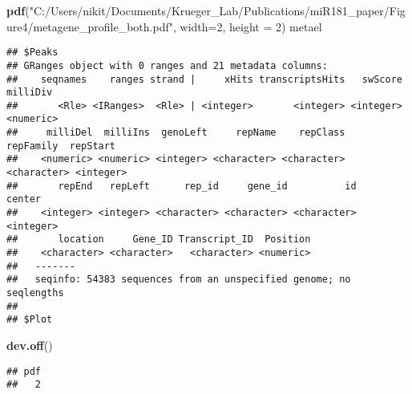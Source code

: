 \documentclass[
]{article}
\newenvironment{Shaded}{\begin{snugshade}}{\end{snugshade}}
\newcommand{\AttributeTok}[1]{\textcolor[rgb]{0.13,0.29,0.53}{#1}}
\newcommand{\CommentTok}[1]{\textcolor[rgb]{0.56,0.35,0.01}{\textit{#1}}}
\newcommand{\DecValTok}[1]{\textcolor[rgb]{0.00,0.00,0.81}{#1}}
\newcommand{\FunctionTok}[1]{\textcolor[rgb]{0.13,0.29,0.53}{\textbf{#1}}}
\newcommand{\NormalTok}[1]{#1}
\newcommand{\OtherTok}[1]{\textcolor[rgb]{0.56,0.35,0.01}{#1}}
\newcommand{\SpecialCharTok}[1]{\textcolor[rgb]{0.81,0.36,0.00}{\textbf{#1}}}
\newcommand{\StringTok}[1]{\textcolor[rgb]{0.31,0.60,0.02}{#1}}
\begin{document}
\begin{Shaded}
\begin{Highlighting}[]
\FunctionTok{pdf}\NormalTok{(}\StringTok{"C:/Users/nikit/Documents/Krueger\_Lab/Publications/miR181\_paper/Figure4/metagene\_profile\_both.pdf"}\NormalTok{, }\AttributeTok{width=}\DecValTok{2}\NormalTok{, }\AttributeTok{height =} \DecValTok{2}\NormalTok{)}
\NormalTok{metael}
\end{Highlighting}
\end{Shaded}

\begin{verbatim}
## $Peaks
## GRanges object with 0 ranges and 21 metadata columns:
##    seqnames    ranges strand |     xHits transcriptsHits   swScore  milliDiv
##       <Rle> <IRanges>  <Rle> | <integer>       <integer> <integer> <numeric>
##     milliDel  milliIns  genoLeft     repName    repClass   repFamily  repStart
##    <numeric> <numeric> <integer> <character> <character> <character> <integer>
##       repEnd   repLeft      rep_id     gene_id          id    center
##    <integer> <integer> <character> <character> <character> <integer>
##       location     Gene_ID Transcript_ID  Position
##    <character> <character>   <character> <numeric>
##   -------
##   seqinfo: 54383 sequences from an unspecified genome; no seqlengths
## 
## $Plot
\end{verbatim}

\begin{Shaded}
\begin{Highlighting}[]
\FunctionTok{dev.off}\NormalTok{()}
\end{Highlighting}
\end{Shaded}

\begin{verbatim}
## pdf 
##   2
\end{verbatim}

\begin{Shaded}
\end{Shaded}
\end{document}
